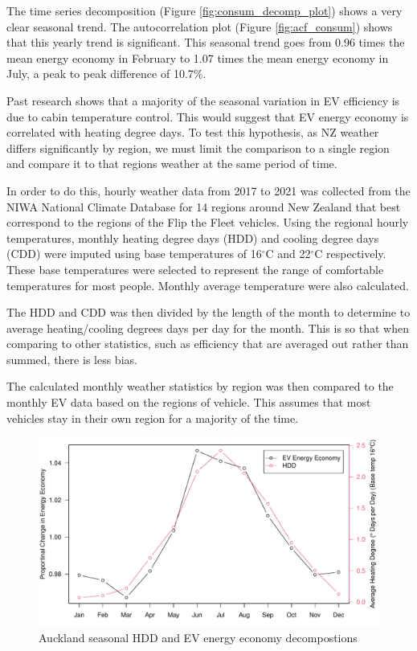 \documentclass[
]{article}
\begin{document}
The time series decomposition (Figure \ref{fig:consum_decomp_plot})
shows a very clear seasonal trend. The autocorrelation plot (Figure
\ref{fig:acf_consum}) shows that this yearly trend is significant. This
seasonal trend goes from 0.96 times the mean energy economy in February
to 1.07 times the mean energy economy in July, a peak to peak difference
of 10.7\%.

Past research shows that a majority of the seasonal variation in EV
efficiency is due to cabin temperature control\cite{ev_range}. This
would suggest that EV energy economy is correlated with heating degree
days. To test this hypothesis, as NZ weather differs significantly by
region, we must limit the comparison to a single region and compare it
to that regions weather at the same period of time.

In order to do this, hourly weather data from 2017 to 2021 was collected
from the NIWA National Climate Database for 14 regions around New
Zealand that best correspond to the regions of the Flip the Fleet
vehicles. Using the regional hourly temperatures, monthly heating degree
days (HDD) and cooling degree days (CDD) were imputed using base
temperatures of 16\(^\circ\)C and 22\(^\circ\)C respectively. These base
temperatures were selected to represent the range of comfortable
temperatures for most people. Monthly average temperature were also
calculated.

The HDD and CDD was then divided by the length of the month to determine
to average heating/cooling degrees days per day for the month. This is
so that when comparing to other statistics, such as efficiency that are
averaged out rather than summed, there is less bias.

The calculated monthly weather statistics by region was then compared to
the monthly EV data based on the regions of vehicle. This assumes that
most vehicles stay in their own region for a majority of the time.

\begin{figure}
\centering
\includegraphics{final_report_files/figure-latex/consum_HDD_plot-1.pdf}
\caption{Auckland seasonal HDD and EV energy economy
decompostions\label{fig:consum_HDD_plot}}
\end{figure}
\end{document}
